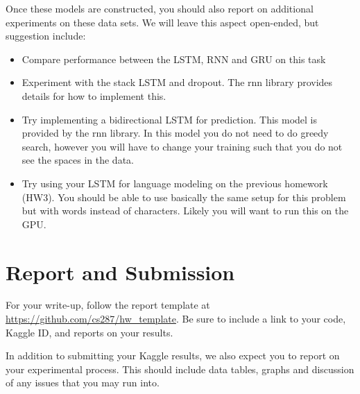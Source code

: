 \documentclass[11pt]{article}
\begin{document}
Once these models are constructed, you should also report on
additional experiments on these data sets. We will leave this aspect
open-ended, but suggestion include:

\begin{itemize}
\item Compare performance between the LSTM, RNN and GRU on this task

\item Experiment with the stack LSTM and dropout. The rnn library provides details for how to implement this. 
\item Try implementing a bidirectional LSTM for prediction. This model is provided by the rnn library. In this model you do not need to do greedy search, however you will 
  have to change your training such that you do not see the spaces in the data.
\item Try using your LSTM for language modeling on the previous
  homework (HW3). You should be able to use basically the same setup
  for this problem but with words instead of characters. Likely you will want to run this on the GPU.
\end{itemize}

\section{Report and Submission}

For your write-up, follow the report template at
\url{https://github.com/cs287/hw_template}. Be sure to include a link
to your code, Kaggle ID, and reports on your results.

In addition to submitting your Kaggle results, we also expect you to report on your 
experimental process. This should include data tables, graphs and discussion of any 
issues that you may run into. 

 

\end{document}
